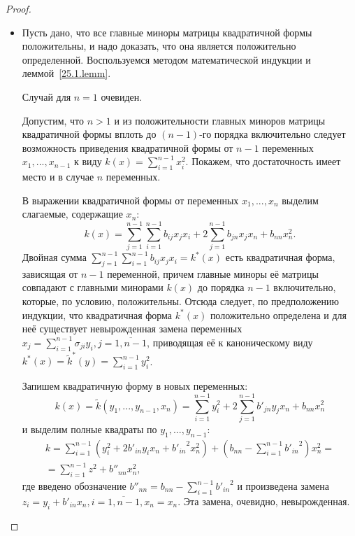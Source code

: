   \begin{proof} \leavevmode
  \begin{itemize}[wide, labelwidth=!, labelindent=\parindent]
  \item[\fbox{дост.:}] Пусть дано, что все главные миноры матрицы квадратичной формы положительны, и надо доказать, что она является положительно определенной. Воспользуемся методом математической индукции и леммой~\ref{25.1.lemm}. 

  Случай для \underline{$n=1$} очевиден. 
  
  Допустим, что \underline{$n>1$} и из положительности главных миноров матрицы квадратичной формы вплоть до $(n-1)$-го порядка включительно следует возможность приведения квадратичной формы от $n-1$ переменных $x_1,...,x_{n-1}$ к виду $k(x)=\sum\limits_{i=1}^{n-1}x_i^2$. Покажем, что достаточность имеет место и в случае $n$ переменных.
  
  В выражении квадратичной формы от переменных $x_1,...,x_n$ выделим слагаемые, содержащие $x_n$:
  \begin{equation*}
  k(x)=\sum_{j=1}^{n-1}\sum_{i=1}^{n-1}b_{ij}x_jx_i+2\sum_{j=1}^{n-1}b_{jn}x_jx_n+b_{nn}x_n^2.
  \end{equation*}
  Двойная сумма $\sum\limits_{j=1}^{n-1}\sum\limits_{i=1}^{n-1}b_{ij}x_jx_i=k^*(x)$ есть квадратичная форма, зависящая от $n-1$ переменной, причем главные миноры её матрицы совпадают с главными минорами $k(x)$ до порядка $n-1$ включительно, которые, по условию, положительны. Отсюда следует, по предположению индукции, что квадратичная форма $k^*(x)$ положительно определена и для неё существует невырожденная замена переменных $x_j=\sum\limits_{i=1}^{n-1}\sigma_{ji}y_i, j=\overline{1,n-1}$, приводящая её к каноническому виду $k^*(x)=\widetilde k^*(y)=\sum\limits_{i=1}^{n-1}y_i^2$.
  
  Запишем квадратичную форму в новых переменных:
  \begin{equation*}
  k(x)=\widetilde k(y_1,...,y_{n-1},x_n)=\sum\limits_{i=1}^{n-1}y_i^2+2\sum_{j=1}^{n-1}b'_{jn}y_jx_n+b_{nn}x_n^2
  \end{equation*}
и выделим полные квадраты по $y_1,...,y_{n-1}$:
  \begin{equation*}\begin{array}{crl}
  k=\sum\limits_{i=1}^{n-1}(y_i^2+2b'_{in}y_ix_n+{b'_{in}}^2x_n^2)+(b_{nn}-\sum\limits_{i=1}^{n-1}{b'_{in}}^2)x_n^2 =\\
  =\sum\limits_{i=1}^{n-1}z^2+b''_{nn}x_n^2,
  \end{array}\end{equation*}
где введено обозначение $ b''_{nn}=b_{nn}-\sum\limits_{i=1}^{n-1}{b'_{in}}^2 $ и произведена замена $z_i=y_i+b'_{in}x_n, i=\overline{1,n-1}, x_n=x_n$. Эта замена, очевидно, невырожденная.


\end{itemize}
\end{proof}
